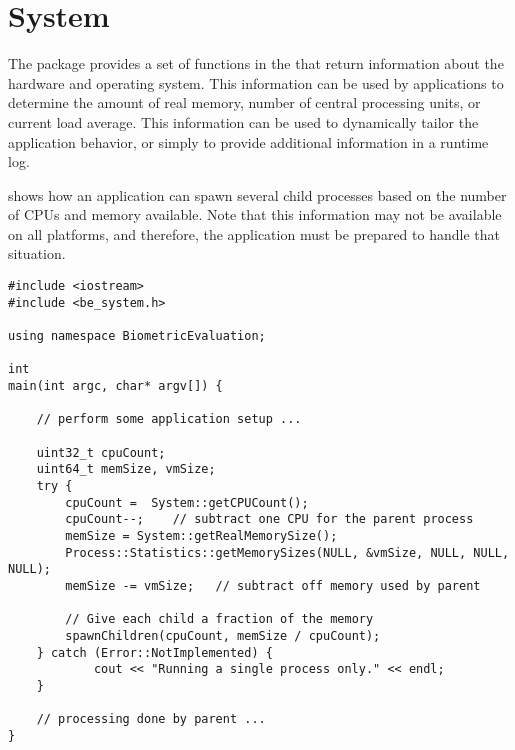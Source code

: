 %
%
\chapter{System}
\label{chp-system}
The  package provides a set of functions in the that
return information about the hardware and operating system. This information
can be used by applications to determine the amount of real memory, number of
central processing units, or current load average. This information can be
used to dynamically tailor the application behavior, or simply to provide
additional information in a runtime log.

 shows how an application can spawn several child
processes based on the number of CPUs and memory available. Note that this
information may not be available on all platforms, and therefore, the
application must be prepared to handle that situation.

\begin{lstlisting}[caption={Using the \namespace{System} CPU Count Information}, label=cpucountuse]
#include <iostream>
#include <be_system.h>

using namespace BiometricEvaluation;

int
main(int argc, char* argv[]) {

    // perform some application setup ...

    uint32_t cpuCount;
    uint64_t memSize, vmSize;
    try {
        cpuCount =  System::getCPUCount();
        cpuCount--;    // subtract one CPU for the parent process
        memSize = System::getRealMemorySize();
        Process::Statistics::getMemorySizes(NULL, &vmSize, NULL, NULL, NULL);
        memSize -= vmSize;   // subtract off memory used by parent

        // Give each child a fraction of the memory
        spawnChildren(cpuCount, memSize / cpuCount);
    } catch (Error::NotImplemented) {
            cout << "Running a single process only." << endl;
    }

    // processing done by parent ...
}

\end{lstlisting}
